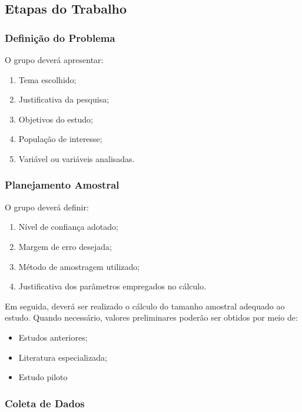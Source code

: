 \documentclass[
  letterpaper,
  DIV=11,
  numbers=noendperiod]{scrreprt}
\providecommand{\tightlist}{%
  \setlength{\itemsep}{0pt}\setlength{\parskip}{0pt}}\usepackage{longtable,booktabs,array}
\begin{document}
\subsection{Etapas do Trabalho}\label{etapas-do-trabalho}

\subsubsection{Definição do Problema}\label{definiuxe7uxe3o-do-problema}

O grupo deverá apresentar:

\begin{enumerate}
\def\labelenumi{\arabic{enumi}.}
\tightlist
\item
  Tema escolhido;
\item
  Justificativa da pesquisa;
\item
  Objetivos do estudo;
\item
  População de interesse;
\item
  Variável ou variáveis analisadas.
\end{enumerate}

\subsubsection{Planejamento Amostral}\label{planejamento-amostral}

O grupo deverá definir:

\begin{enumerate}
\def\labelenumi{\arabic{enumi}.}
\tightlist
\item
  Nível de confiança adotado;
\item
  Margem de erro desejada;
\item
  Método de amostragem utilizado;
\item
  Justificativa dos parâmetros empregados no cálculo.
\end{enumerate}

Em seguida, deverá ser realizado o cálculo do tamanho amostral adequado
ao estudo. Quando necessário, valores preliminares poderão ser obtidos
por meio de:

\begin{itemize}
\tightlist
\item
  Estudos anteriores;
\item
  Literatura especializada;
\item
  Estudo piloto
\end{itemize}

\subsubsection{Coleta de Dados}\label{coleta-de-dados}
\end{document}

